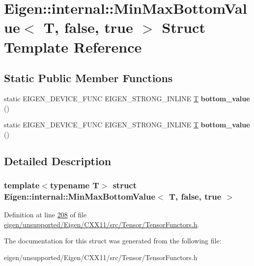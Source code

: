 \hypertarget{struct_eigen_1_1internal_1_1_min_max_bottom_value_3_01_t_00_01false_00_01true_01_4}{}\section{Eigen\+:\+:internal\+:\+:Min\+Max\+Bottom\+Value$<$ T, false, true $>$ Struct Template Reference}
\label{struct_eigen_1_1internal_1_1_min_max_bottom_value_3_01_t_00_01false_00_01true_01_4}
\subsection*{Static Public Member Functions}
\begin{DoxyCompactItemize}
\item 
\mbox{\label{struct_eigen_1_1internal_1_1_min_max_bottom_value_3_01_t_00_01false_00_01true_01_4_a2c4e67168a4a27191e07a93718abb57c}} 
static E\+I\+G\+E\+N\+\_\+\+D\+E\+V\+I\+C\+E\+\_\+\+F\+U\+NC E\+I\+G\+E\+N\+\_\+\+S\+T\+R\+O\+N\+G\+\_\+\+I\+N\+L\+I\+NE \hyperlink{group___sparse_core___module}{T} {\bfseries bottom\+\_\+value} ()
\item 
\mbox{\label{struct_eigen_1_1internal_1_1_min_max_bottom_value_3_01_t_00_01false_00_01true_01_4_a2c4e67168a4a27191e07a93718abb57c}} 
static E\+I\+G\+E\+N\+\_\+\+D\+E\+V\+I\+C\+E\+\_\+\+F\+U\+NC E\+I\+G\+E\+N\+\_\+\+S\+T\+R\+O\+N\+G\+\_\+\+I\+N\+L\+I\+NE \hyperlink{group___sparse_core___module}{T} {\bfseries bottom\+\_\+value} ()
\end{DoxyCompactItemize}


\subsection{Detailed Description}
\subsubsection*{template$<$typename T$>$\newline
struct Eigen\+::internal\+::\+Min\+Max\+Bottom\+Value$<$ T, false, true $>$}



Definition at line \hyperlink{eigen_2unsupported_2_eigen_2_c_x_x11_2src_2_tensor_2_tensor_functors_8h_source_l00208}{208} of file \hyperlink{eigen_2unsupported_2_eigen_2_c_x_x11_2src_2_tensor_2_tensor_functors_8h_source}{eigen/unsupported/\+Eigen/\+C\+X\+X11/src/\+Tensor/\+Tensor\+Functors.\+h}.



The documentation for this struct was generated from the following file\+:\begin{DoxyCompactItemize}
\item 
eigen/unsupported/\+Eigen/\+C\+X\+X11/src/\+Tensor/\+Tensor\+Functors.\+h\end{DoxyCompactItemize}
